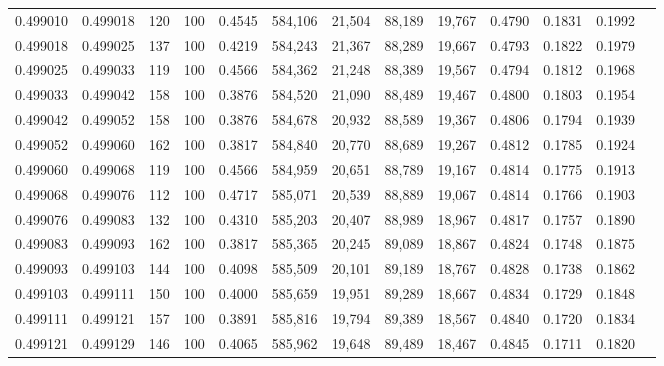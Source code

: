 \begin{tabular}{rrrrrrrrrrrrr}
0.499010 & 0.499018 &   120 & 100 &                                     0.4545 & 584,106 &  21,504 &  88,189 &  19,767 & 0.4790 & 0.1831 & 0.1992 \\
0.499018 & 0.499025 &   137 & 100 &                                     0.4219 & 584,243 &  21,367 &  88,289 &  19,667 & 0.4793 & 0.1822 & 0.1979 \\
0.499025 & 0.499033 &   119 & 100 &                                     0.4566 & 584,362 &  21,248 &  88,389 &  19,567 & 0.4794 & 0.1812 & 0.1968 \\
0.499033 & 0.499042 &   158 & 100 &                                     0.3876 & 584,520 &  21,090 &  88,489 &  19,467 & 0.4800 & 0.1803 & 0.1954 \\
0.499042 & 0.499052 &   158 & 100 &                                     0.3876 & 584,678 &  20,932 &  88,589 &  19,367 & 0.4806 & 0.1794 & 0.1939 \\
0.499052 & 0.499060 &   162 & 100 &                                     0.3817 & 584,840 &  20,770 &  88,689 &  19,267 & 0.4812 & 0.1785 & 0.1924 \\
0.499060 & 0.499068 &   119 & 100 &                                     0.4566 & 584,959 &  20,651 &  88,789 &  19,167 & 0.4814 & 0.1775 & 0.1913 \\
0.499068 & 0.499076 &   112 & 100 &                                     0.4717 & 585,071 &  20,539 &  88,889 &  19,067 & 0.4814 & 0.1766 & 0.1903 \\
0.499076 & 0.499083 &   132 & 100 &                                     0.4310 & 585,203 &  20,407 &  88,989 &  18,967 & 0.4817 & 0.1757 & 0.1890 \\
0.499083 & 0.499093 &   162 & 100 &                                     0.3817 & 585,365 &  20,245 &  89,089 &  18,867 & 0.4824 & 0.1748 & 0.1875 \\
0.499093 & 0.499103 &   144 & 100 &                                     0.4098 & 585,509 &  20,101 &  89,189 &  18,767 & 0.4828 & 0.1738 & 0.1862 \\
0.499103 & 0.499111 &   150 & 100 &                                     0.4000 & 585,659 &  19,951 &  89,289 &  18,667 & 0.4834 & 0.1729 & 0.1848 \\
0.499111 & 0.499121 &   157 & 100 &                                     0.3891 & 585,816 &  19,794 &  89,389 &  18,567 & 0.4840 & 0.1720 & 0.1834 \\
0.499121 & 0.499129 &   146 & 100 &                                     0.4065 & 585,962 &  19,648 &  89,489 &  18,467 & 0.4845 & 0.1711 & 0.1820 \\

\end{tabular}
